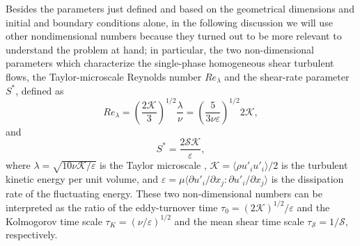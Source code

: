 Besides the parameters just defined and based on the geometrical dimensions and initial and boundary conditions alone, in the following discussion we will use other nondimensional numbers because they turned out to be more relevant to understand the problem at hand; in particular, the two non-dimensional parameters which characterize the single-phase homogeneous shear turbulent flows, the Taylor-microscale Reynolds number $Re_\lambda$ and the shear-rate parameter $S^*$, defined as
\begin{equation}
\label{eq:rel}
Re_\lambda = \left( \frac{2\mathcal{K} }{3} \right)^{1/2} \frac{\lambda}{\nu} = \left( \frac{5}{3 \nu \varepsilon } \right)^{1/2} 2\mathcal{K},
\end{equation}
and
\begin{equation}
\label{eq:ss}
S^* = \frac{2 \mathcal{S} \mathcal{K} }{\varepsilon},
\end{equation}
where $\lambda = \sqrt{10\nu \mathcal{K}/\varepsilon}$ is the Taylor microscale \citep{sekimoto_dong_jimenez_2016a}, $\mathcal{K} = \langle \rho u'_i u'_i \rangle/2$ is the turbulent kinetic energy per unit volume, and $\varepsilon = \mu \langle \partial u'_i/\partial x_j : \partial u'_i/\partial x_j \rangle$ is the dissipation rate of the fluctuating energy. These two non-dimensional numbers can be interpreted as the ratio of the eddy-turnover time $\tau_0= \left( 2\mathcal{K} \right)^{1/2}/\varepsilon$ and the Kolmogorov time scale $\tau_K= \left( \nu / \varepsilon \right)^{1/2}$ and the mean shear time scale $\tau_\mathcal{S} = 1/ \mathcal{S}$, respectively.


